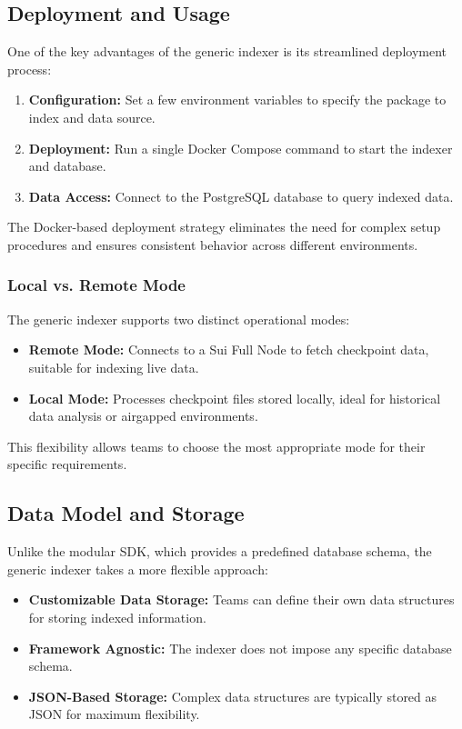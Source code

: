 \subsection{Deployment and Usage}

One of the key advantages of the generic indexer is its streamlined deployment process:

\begin{enumerate}
    \item \textbf{Configuration:} Set a few environment variables to specify the package to index and data source.
    \item \textbf{Deployment:} Run a single Docker Compose command to start the indexer and database.
    \item \textbf{Data Access:} Connect to the PostgreSQL database to query indexed data.
\end{enumerate}

The Docker-based deployment strategy eliminates the need for complex setup procedures and ensures consistent behavior across different environments.

\subsubsection{Local vs. Remote Mode}

The generic indexer supports two distinct operational modes:

\begin{itemize}
    \item \textbf{Remote Mode:} Connects to a Sui Full Node to fetch checkpoint data, suitable for indexing live data.
    \item \textbf{Local Mode:} Processes checkpoint files stored locally, ideal for historical data analysis or airgapped environments.
\end{itemize}

This flexibility allows teams to choose the most appropriate mode for their specific requirements.

\subsection{Data Model and Storage}

Unlike the modular SDK, which provides a predefined database schema, the generic indexer takes a more flexible approach:

\begin{itemize}
    \item \textbf{Customizable Data Storage:} Teams can define their own data structures for storing indexed information.
    \item \textbf{Framework Agnostic:} The indexer does not impose any specific database schema.
    \item \textbf{JSON-Based Storage:} Complex data structures are typically stored as JSON for maximum flexibility.
\end{itemize}

